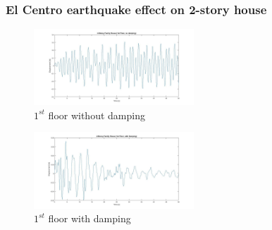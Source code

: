 \documentclass[xcolor=svgnames,9pt]{beamer}
\theoremstyle{remark}
\begin{document}
		\begin{frame}
			\frametitle{El Centro earthquake effect on 2-story house}
				\begin{figure}[h!]
   					\centering
   					\includegraphics[width=60mm]{pictures/FM1.jpg}
					\caption{$1^{st}$ floor without damping}
					\label{FM1}
  				\end{figure}
				\begin{figure}[h!]
   					\centering
   					\includegraphics[width=60mm]{pictures/FMD1.jpg}
					\caption{$1^{st}$ floor with damping}
					\label{FMD1}
  				\end{figure}
		\end{frame}
\end{document}
